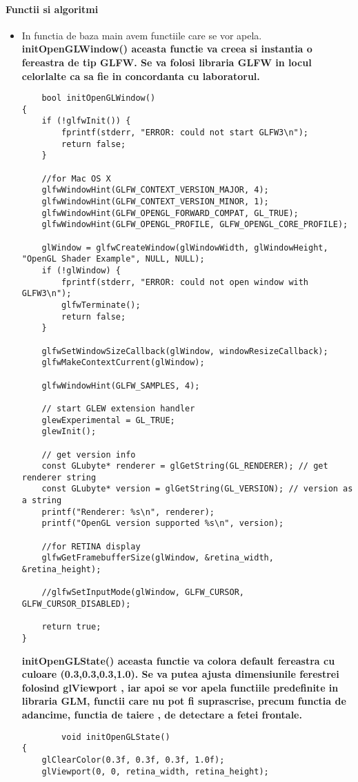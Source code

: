 \graphicspath{ {images/} }


\paragraph{Functii si algoritmi}

\begin{itemize}
\item
	\tab In functia de baza main avem functiile care se vor apela.\\
	\tab \tab \bf{initOpenGLWindow()} aceasta functie va creea si instantia o fereastra de tip GLFW. Se va folosi libraria GLFW in locul celorlalte ca sa fie in concordanta cu laboratorul.\\
	\begin{verbatim}
	bool initOpenGLWindow()
{
	if (!glfwInit()) {
		fprintf(stderr, "ERROR: could not start GLFW3\n");
		return false;
	}

	//for Mac OS X
	glfwWindowHint(GLFW_CONTEXT_VERSION_MAJOR, 4);
	glfwWindowHint(GLFW_CONTEXT_VERSION_MINOR, 1);
	glfwWindowHint(GLFW_OPENGL_FORWARD_COMPAT, GL_TRUE);
	glfwWindowHint(GLFW_OPENGL_PROFILE, GLFW_OPENGL_CORE_PROFILE);

	glWindow = glfwCreateWindow(glWindowWidth, glWindowHeight, "OpenGL Shader Example", NULL, NULL);
	if (!glWindow) {
		fprintf(stderr, "ERROR: could not open window with GLFW3\n");
		glfwTerminate();
		return false;
	}

	glfwSetWindowSizeCallback(glWindow, windowResizeCallback);
	glfwMakeContextCurrent(glWindow);

	glfwWindowHint(GLFW_SAMPLES, 4);

	// start GLEW extension handler
	glewExperimental = GL_TRUE;
	glewInit();

	// get version info
	const GLubyte* renderer = glGetString(GL_RENDERER); // get renderer string
	const GLubyte* version = glGetString(GL_VERSION); // version as a string
	printf("Renderer: %s\n", renderer);
	printf("OpenGL version supported %s\n", version);

	//for RETINA display
	glfwGetFramebufferSize(glWindow, &retina_width, &retina_height);

    //glfwSetInputMode(glWindow, GLFW_CURSOR, GLFW_CURSOR_DISABLED);

	return true;
}
	\end{verbatim}
	
	\tab \tab \bf{initOpenGLState()} aceasta functie va colora default fereastra cu culoare (0.3,0.3,0.3,1.0). Se va putea ajusta dimensiunile ferestrei folosind glViewport , iar apoi se vor apela functiile predefinite in libraria GLM, functii care nu pot fi suprascrise, precum functia de adancime, functia de taiere , de detectare a fetei frontale.\\ 
	\begin{verbatim}
		void initOpenGLState()
{
	glClearColor(0.3f, 0.3f, 0.3f, 1.0f);
	glViewport(0, 0, retina_width, retina_height);


\end{verbatim}
\end{itemize}
